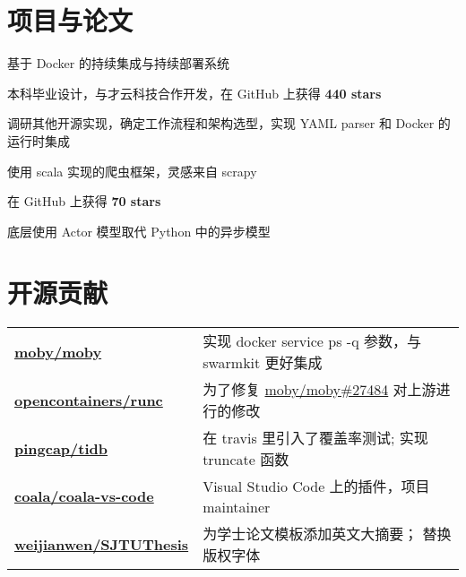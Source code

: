 \documentclass[]{deedy-resume-openfont}
\begin{document}
\begin{minipage}[t]{0.73\textwidth}
\section{项目与论文}
\sectionsep
{}
\begin{tightemize}
    \item 基于 Docker 的持续集成与持续部署系统
    \item 本科毕业设计，与才云科技合作开发，在 GitHub 上获得 \textbf{440 stars}
    \item 调研其他开源实现，确定工作流程和架构选型，实现 YAML parser 和 Docker 的运行时集成
    \end{tightemize}
\sectionsep

\begin{tightemize}
    \item 使用 scala 实现的爬虫框架，灵感来自 scrapy
    \item 在 GitHub 上获得 \textbf{70 stars}
    \item 底层使用 Actor 模型取代 Python 中的异步模型
    \end{tightemize}
\sectionsep


\section{开源贡献}
\begin{tabular}{ll}
\href{https://github.com/moby/moby/commits?author=gaocegege}{\bf moby/moby} & 实现 docker service ps -q 参数，与 swarmkit 更好集成 \\
\href{https://github.com/opencontainers/runc/commits?author=gaocegege}{\bf opencontainers/runc} & 为了修复 \href{https://github.com/moby/moby/issues/27484}{moby/moby\#27484} 对上游进行的修改 \\
\href{https://github.com/pingcap/tidb/commits?author=gaocegege}{\bf pingcap/tidb} & 在 travis 里引入了覆盖率测试; 实现 truncate 函数 \\
\href{https://github.com/coala/coala-vs-code/commits/master?author=gaocegege}{\bf coala/coala-vs-code} & Visual Studio Code 上的插件，项目 maintainer \\
\href{https://github.com/weijianwen/SJTUThesis/commits?author=gaocegege}{\bf weijianwen/SJTUThesis} & 为学士论文模板添加英文大摘要； 替换版权字体 \\
\end{tabular}
\sectionsep


\end{minipage}
\end{document}
